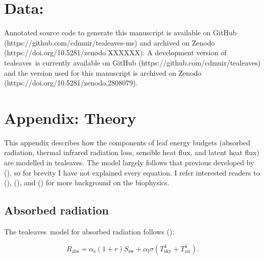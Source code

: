 \documentclass[11pt, oneside]{article}
\newcommand{\pkg}[1]{{\fontseries{b}\selectfont #1}}
\newcommand{\tealeaves}{\pkg{tealeaves}}
\begin{document}
\section*{Data:}  

Annotated source code to generate this manuscript is available on GitHub (https://github.com/cdmuir/tealeaves-ms) and archived on Zenodo (https://doi.org/10.5281/zenodo.XXXXXX). A development version of \tealeaves~is currently available on GitHub (https://github.com/cdmuir/tealeaves) and the version used for this manuscript is archived on Zenodo (https://doi.org/10.5281/zenodo.2808079).





\clearpage


\section*{Appendix: Theory}

This appendix describes how the components of leaf energy budgets (absorbed radiation, thermal infrared radiation loss, sensible heat flux, and latent heat flux) are modelled in \tealeaves. The model largely follows that previous developed by \citeauthor{Foster_Smith_1986} (\citeyear{Foster_Smith_1986}), so for brevity I have not explained every equation. I refer interested readers to \citeauthor{Nobel_2009} (\citeyear{Nobel_2009}), \citeauthor{Monteith_Unsworth_2013} (\citeyear{Monteith_Unsworth_2013}), and \citeauthor{Jones_2014} (\citeyear{Jones_2014}) for more background on the biophysics.

\subsection*{Absorbed radiation}

The \tealeaves~model for absorbed radiation follows \citeauthor{Okajima_etal_2012} (\citeyear{Okajima_etal_2012}):

\begin{equation}
  R_\mathrm{abs} = \alpha_\mathrm{s} (1 + r) S_\mathrm{sw} + \alpha_\mathrm{l} \sigma (T_\mathrm{sky} ^ 4 + T_\mathrm{air} ^ 4).
\end{equation}
\end{document}
